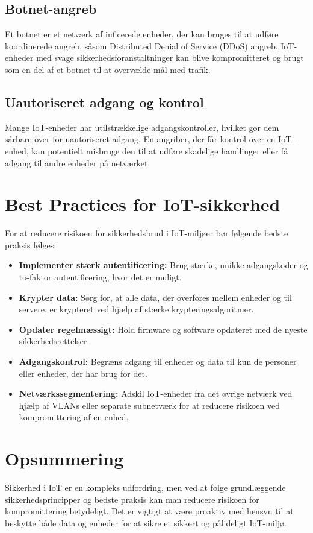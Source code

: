 \subsection*{Botnet-angreb}
Et botnet er et netværk af inficerede enheder, der kan bruges til at udføre koordinerede angreb, såsom Distributed Denial of Service (DDoS) angreb. IoT-enheder med svage sikkerhedsforanstaltninger kan blive kompromitteret og brugt som en del af et botnet til at overvælde mål med trafik.

\subsection*{Uautoriseret adgang og kontrol}
Mange IoT-enheder har utilstrækkelige adgangskontroller, hvilket gør dem sårbare over for uautoriseret adgang. En angriber, der får kontrol over en IoT-enhed, kan potentielt misbruge den til at udføre skadelige handlinger eller få adgang til andre enheder på netværket.

\section*{Best Practices for IoT-sikkerhed}
For at reducere risikoen for sikkerhedsbrud i IoT-miljøer bør følgende bedste praksis følges:
\begin{itemize}
	\item \textbf{Implementer stærk autentificering:} Brug stærke, unikke adgangskoder og to-faktor autentificering, hvor det er muligt.
	\item \textbf{Krypter data:} Sørg for, at alle data, der overføres mellem enheder og til servere, er krypteret ved hjælp af stærke krypteringsalgoritmer.
	\item \textbf{Opdater regelmæssigt:} Hold firmware og software opdateret med de nyeste sikkerhedsrettelser.
	\item \textbf{Adgangskontrol:} Begræns adgang til enheder og data til kun de personer eller enheder, der har brug for det.
	\item \textbf{Netværkssegmentering:} Adskil IoT-enheder fra det øvrige netværk ved hjælp af VLANs eller separate subnetværk for at reducere risikoen ved kompromittering af en enhed.
\end{itemize}

\section*{Opsummering}
Sikkerhed i IoT er en kompleks udfordring, men ved at følge grundlæggende sikkerhedsprincipper og bedste praksis kan man reducere risikoen for kompromittering betydeligt. Det er vigtigt at være proaktiv med hensyn til at beskytte både data og enheder for at sikre et sikkert og pålideligt IoT-miljø.